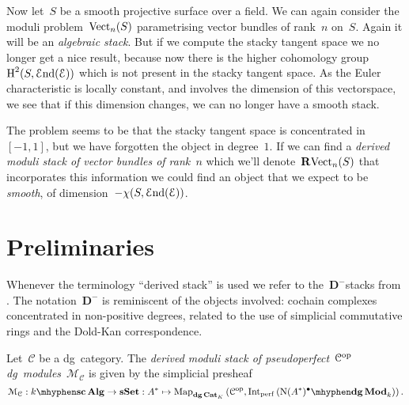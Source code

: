 \begin{refsection}
\begin{example}
  Now let~$S$ be a smooth projective surface over a field. We can again consider the moduli problem~$\mathrm{Vect}_n(S)$ parametrising vector bundles of rank~$n$ on~$S$. Again it will be an \emph{algebraic stack}. But if we compute the stacky tangent space we no longer get a nice result, because now there is the higher cohomology group~$\operatorname{H}^2(S,\operatorname{\mathcal{E}nd}(\mathcal{E}))$ which is not present in the stacky tangent space. As the Euler characteristic is locally constant, and involves the dimension of this vectorspace, we see that if this dimension changes, we can no longer have a smooth stack.
\end{example}

\begin{remark}
  The problem seems to be that the stacky tangent space is concentrated in~$[-1,1]$, but we have forgotten the object in degree~$1$. If we can find a \emph{derived moduli stack of vector bundles of rank~$n$} which we'll denote~$\mathbf{R}\mathrm{Vect}_n(S)$ that incorporates this information we could find an object that we expect to be \emph{smooth}, of dimension~$-\chi(S,\operatorname{\mathcal{E}nd}(\mathcal{E}))$.
\end{remark}

\section{Preliminaries}
\label{section:preliminaries}
Whenever the terminology ``derived stack'' is used we refer to the~$\mathbf{D}^-$\dash stacks from \cite{hagII}. The notation~$\mathbf{D}^-$ is reminiscent of the objects involved: cochain complexes concentrated in non-positive degrees, related to the use of simplicial commutative rings and the Dold-Kan correspondence.

\begin{definition}
  Let~$\mathcal{C}$ be a dg~category. The \emph{derived moduli stack of pseudoperfect~$\mathcal{C}^{\mathrm{op}}$\dash dg~modules}~$\mathcal{M}_{\mathcal{C}}$ is given by the simplicial presheaf
  \begin{equation}
    \mathcal{M}_{\mathcal{C}}:\scAlg{k}\to\sSet:A^*\mapsto\Map_{\dgCat_K}\left( \mathcal{C}^\opp,\Int_\perf\left( \dgMod{\nerve(A^*)^\bullet}_k \right) \right).
  \end{equation}
\end{definition}


\end{refsection}
